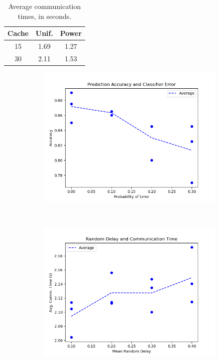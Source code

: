 \documentclass[11pt]{article}
\begin{document}
\begin{table}
    \begin{tabular}{|c|c|c|}
        \hline
        Cache &  Unif. &  Power \\ \hline \hline
        15 & 1.69 & 1.27 \\ \hline
        30 & 2.11 & 1.53 \\ \hline
    \end{tabular}
    \caption{Average communication times, in seconds.}%
    \label{tab:cache}
\end{table}


\begin{figure}[h]
    \centering
    \begin{subfigure}{0.35\textwidth}
        \includegraphics[width=\textwidth]{plot_1_final.png}
    \end{subfigure}
    ~
    \begin{subfigure}{0.35\textwidth}
        \includegraphics[width=\textwidth]{plot_3_final.png}

\end{subfigure}
\end{figure}
\end{document}
